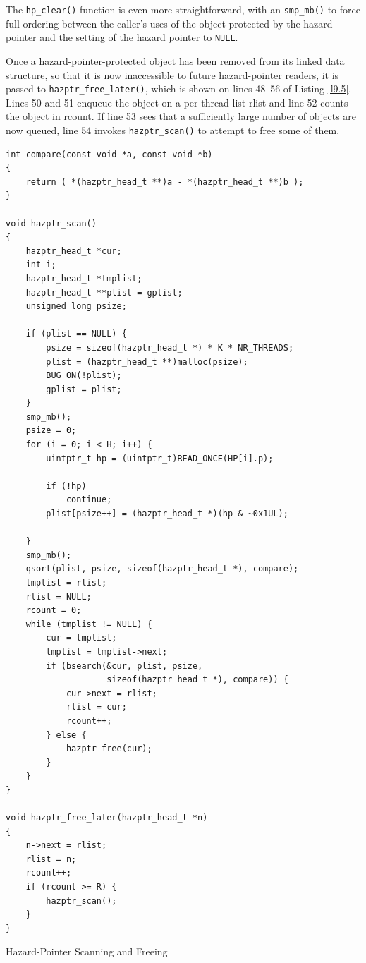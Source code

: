 \documentclass[11pt]{article}
\begin{document}
The \texttt{hp\_clear()} function is even more straightforward, with an \texttt{smp\_mb()} to force full ordering between
the caller’s uses of the object protected by the hazard pointer and the setting of the hazard pointer
to \texttt{NULL}.

Once a hazard-pointer-protected object has been removed from its linked data structure, so that it is
now inaccessible to future hazard-pointer readers, it is passed to \texttt{hazptr\_free\_later()}, which is shown
on lines 48–56 of Listing \ref{l9.5}. Lines 50 and 51 enqueue the object on a per-thread list rlist and
line 52 counts the object in rcount. If line 53 sees that a sufficiently large number of objects are
now queued, line 54 invokes \texttt{hazptr\_scan()} to attempt to free some of them.

\begin{listing}[htbp]
\begin{verbatim}
int compare(const void *a, const void *b)
{
    return ( *(hazptr_head_t **)a - *(hazptr_head_t **)b );
}

void hazptr_scan()
{
    hazptr_head_t *cur;
    int i;
    hazptr_head_t *tmplist;
    hazptr_head_t **plist = gplist;
    unsigned long psize;

    if (plist == NULL) {
        psize = sizeof(hazptr_head_t *) * K * NR_THREADS;
        plist = (hazptr_head_t **)malloc(psize);
        BUG_ON(!plist);
        gplist = plist;
    }
    smp_mb();
    psize = 0;
    for (i = 0; i < H; i++) {
        uintptr_t hp = (uintptr_t)READ_ONCE(HP[i].p);

        if (!hp)
            continue;
        plist[psize++] = (hazptr_head_t *)(hp & ~0x1UL);

    }
    smp_mb();
    qsort(plist, psize, sizeof(hazptr_head_t *), compare);
    tmplist = rlist;
    rlist = NULL;
    rcount = 0;
    while (tmplist != NULL) {
        cur = tmplist;
        tmplist = tmplist->next;
        if (bsearch(&cur, plist, psize,
                    sizeof(hazptr_head_t *), compare)) {
            cur->next = rlist;
            rlist = cur;
            rcount++;
        } else {
            hazptr_free(cur);
        }
    }
}

void hazptr_free_later(hazptr_head_t *n)
{
    n->next = rlist;
    rlist = n;
    rcount++;
    if (rcount >= R) {
        hazptr_scan();
    }
}
\end{verbatim}
\caption{\label{l9.5}Hazard-Pointer Scanning and Freeing}
\end{listing}
\end{document}
